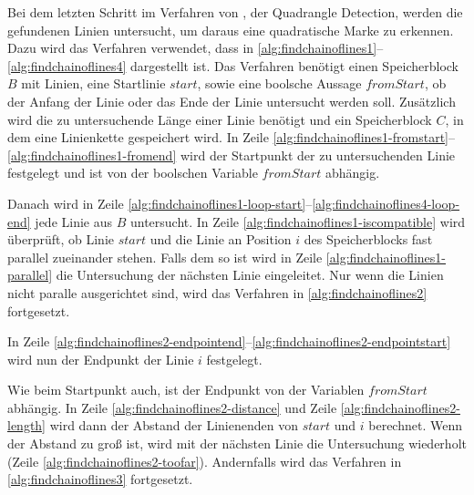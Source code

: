 Bei dem letzten Schritt im Verfahren von \citeauthor{hirzer08}, der Quadrangle Detection, werden die gefundenen Linien
 untersucht, um daraus eine quadratische Marke zu erkennen. Dazu wird das Verfahren 
 verwendet, dass in \autoref{alg:findchainoflines1}--\autoref{alg:findchainoflines4} dargestellt ist. Das Verfahren
 benötigt einen Speicherblock $B$ mit Linien, eine Startlinie $\mathit{start}$, sowie eine boolsche Aussage
 $\mathit{fromStart}$, ob der Anfang der Linie oder das Ende der Linie untersucht werden soll. Zusätzlich wird die zu
 untersuchende Länge einer Linie benötigt und ein Speicherblock $C$, in dem eine Linienkette gespeichert wird. In Zeile
 \ref{alg:findchainoflines1-fromstart}--\ref{alg:findchainoflines1-fromend} wird der Startpunkt der zu
 untersuchenden Linie festgelegt und ist von der boolschen Variable $\mathit{fromStart}$ abhängig.

Danach wird in Zeile \ref{alg:findchainoflines1-loop-start}--\ref{alg:findchainoflines4-loop-end} jede Linie aus $B$
 untersucht. In Zeile \ref{alg:findchainoflines1-iscompatible} wird überprüft, ob Linie $\mathit{start}$ und die Linie
 an Position $i$ des Speicherblocks fast parallel zueinander stehen. Falls dem so ist wird in Zeile
 \ref{alg:findchainoflines1-parallel} die Untersuchung der nächsten Linie eingeleitet. Nur wenn die Linien nicht
 paralle ausgerichtet sind, wird das Verfahren in \autoref{alg:findchainoflines2} fortgesetzt.

In Zeile \ref{alg:findchainoflines2-endpointend}--\ref{alg:findchainoflines2-endpointstart} wird nun der Endpunkt der
 Linie $i$ festgelegt.

Wie beim Startpunkt auch, ist der Endpunkt von der Variablen $\mathit{fromStart}$ abhängig. In Zeile
 \ref{alg:findchainoflines2-distance} und Zeile \ref{alg:findchainoflines2-length} wird dann der Abstand der
 Linienenden von $\mathit{start}$ und $i$ berechnet. Wenn der Abstand zu groß ist, wird mit der nächsten Linie die
 Untersuchung wiederholt (Zeile \ref{alg:findchainoflines2-toofar}). Andernfalls wird das Verfahren in
 \autoref{alg:findchainoflines3} fortgesetzt.

